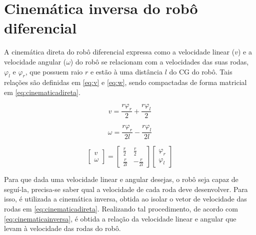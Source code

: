 \section{Cinemática inversa do robô diferencial}

A cinemática direta do robô diferencial expressa como a velocidade linear ($v$) e a velocidade angular ($\omega$) do robô se relacionam com a velocidades das suas rodas, $\varphi_l$ e $\varphi_r$, que possuem raio $r$ e estão à uma distância $l$ do CG do robô. Tais relações são definidas em \eqref{eq:v} e \eqref{eq:w}, sendo compactadas de forma matricial em \eqref{eq:cinematicadireta}.

\begin{equation}\label{eq:v}
	v = \frac{r\varphi_r}{2} + \frac{r\varphi_l}{2}
\end{equation}

\begin{equation}\label{eq:w}
	\omega = \frac{r\varphi_r}{2l} - \frac{r\varphi_l}{2l}
\end{equation}

\begin{equation}\label{eq:cinematicadireta}
	\begin{bmatrix}
		v \\ \omega
	\end{bmatrix} = \begin{bmatrix}
	\frac{r}{2} & \frac{r}{2} \\
	\frac{r}{2l} & -\frac{r}{2l} 
	\end{bmatrix} \begin{bmatrix}
	\varphi_r \\ \varphi_l
	\end{bmatrix}
\end{equation}


Para que dada uma velocidade linear e angular desejas, o robô seja capaz de seguí-la, precisa-se saber qual a velocidade de cada roda deve desenvolver. Para isso, é utilizada a cinemática inversa, obtida ao isolar o vetor de velocidade das rodas em \eqref{eq:cinematicadireta}. Realizando tal procedimento, de acordo com \eqref{eq:cinematicainversa}, é obtida a relação da velocidade linear e angular que levam à velocidade das rodas do robô.


